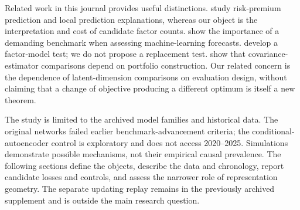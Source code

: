Related work in this journal provides useful distinctions. \citet{lo2023qf} study risk-premium prediction and local prediction explanations, whereas our object is the interpretation and cost of candidate factor counts. \citet{xu2024qf} show the importance of a demanding benchmark when assessing machine-learning forecasts. \citet{jiang2025qf} develop a factor-model test; we do not propose a replacement test. \citet{dom2025qf} show that covariance-estimator comparisons depend on portfolio construction. Our related concern is the dependence of latent-dimension comparisons on evaluation design, without claiming that a change of objective producing a different optimum is itself a new theorem.

The study is limited to the archived model families and historical data. The original networks failed earlier benchmark-advancement criteria; the conditional-autoencoder control is exploratory and does not access 2020--2025. Simulations demonstrate possible mechanisms, not their empirical causal prevalence. The following sections define the objects, describe the data and chronology, report candidate losses and controls, and assess the narrower role of representation geometry. The separate updating replay remains in the previously archived supplement and is outside the main research question.
